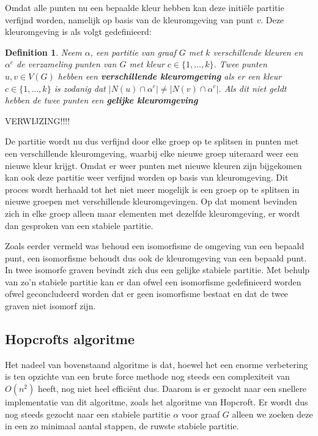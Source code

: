 \documentclass[twoside]{article}
\newtheorem{definition}{Definition}[section]
\begin{document}
\begin{multicols}{2}
Omdat alle punten nu een bepaalde kleur hebben kan deze initi\"ele partitie verfijnd worden, namelijk op basis van de kleuromgeving van punt $v$. Deze kleuromgeving is als volgt gedefinieerd:

\begin{definition}
Neem $\alpha$, een partitie van graaf $G$ met $k$ verschillende kleuren en  $\alpha^{c}$ de verzameling punten van $G$ met kleur $c \in \{1,\ldots,k\}$. Twee punten $u,v \in V(G)$ hebben een \textbf{verschillende kleuromgeving} als er een kleur $c \in \{1,\ldots,k\}$ is zodanig dat $|N(u)\cap\alpha^{c}| \neq |N(v)\cap\alpha^{c}|$. Als dit niet geldt hebben de twee punten een \textbf{gelijke kleuromgeving}
\end{definition}
VERWIJZING!!!!

De partitie wordt nu dus verfijnd door elke groep op te splitsen in punten met een verschillende kleuromgeving, waarbij elke nieuwe groep uiteraard weer een nieuwe kleur krijgt. Omdat er weer punten met nieuwe kleuren zijn bijgekomen kan ook deze partitie weer verfijnd worden op basis van kleuromgeving. Dit proces wordt herhaald tot het niet meer mogelijk is een groep op te splitsen in nieuwe groepen met verschillende kleuromgevingen. Op dat moment bevinden zich in elke groep alleen maar elementen met dezelfde kleuromgeving, er wordt dan gesproken van een stabiele partitie.

Zoals eerder vermeld was behoud een isomorfisme de omgeving van een bepaald punt, een isomorfisme behoudt dus ook de kleuromgeving van een bepaald punt. In twee isomorfe graven bevindt zich dus een gelijke stabiele partitie. Met behulp van zo'n stabiele partitie kan er dan ofwel een isomorfisme gedefinieerd worden ofwel geconcludeerd worden dat er geen isomorfisme bestaat en dat de twee graven niet isomorf zijn.

\subsection{Hopcrofts algoritme}
Het nadeel van bovenstaand algoritme is dat, hoewel het een enorme verbetering is ten opzichte van een brute force methode nog steeds een complexiteit van $O(n^2)$ heeft, nog niet heel effici\"ent dus. Daarom is er gezocht naar een snellere implementatie van dit algoritme, zoals het algoritme van Hopcroft. Er wordt dus nog steeds gezocht naar een stabiele partitie $\alpha$ voor graaf $G$ alleen we zoeken deze in een zo minimaal aantal stappen, de ruwste stabiele partitie.


\end{multicols}
\end{document}
